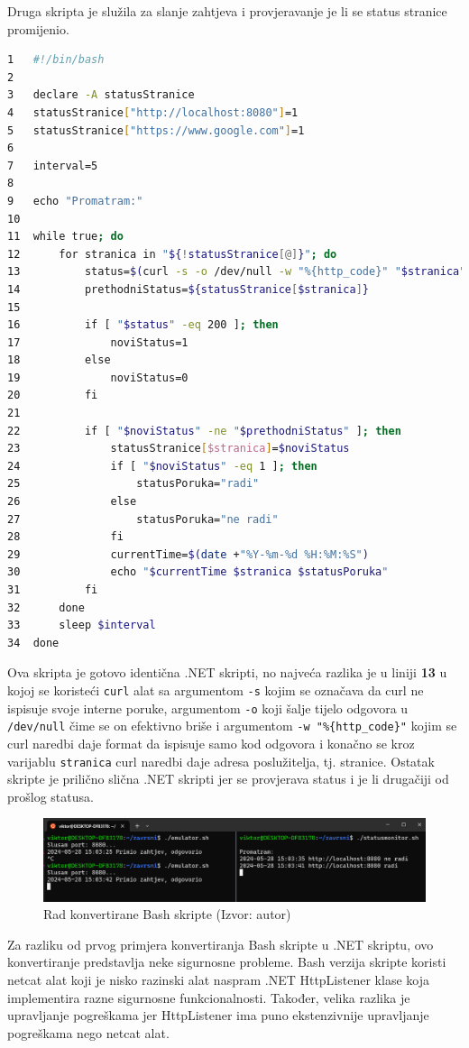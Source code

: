 \documentclass{foi}
\begin{document}
Druga skripta je služila za slanje zahtjeva i provjeravanje je li se status stranice promijenio.
\begin{lstlisting}[language=bash]
1   #!/bin/bash
2   
3   declare -A statusStranice
4   statusStranice["http://localhost:8080"]=1
5   statusStranice["https://www.google.com"]=1
6   
7   interval=5
8   
9   echo "Promatram:"
10  
11  while true; do
12      for stranica in "${!statusStranice[@]}"; do
13          status=$(curl -s -o /dev/null -w "%{http_code}" "$stranica")
14          prethodniStatus=${statusStranice[$stranica]}
15          
16          if [ "$status" -eq 200 ]; then
17              noviStatus=1
18          else
19              noviStatus=0
20          fi
21  
22          if [ "$noviStatus" -ne "$prethodniStatus" ]; then
23              statusStranice[$stranica]=$noviStatus
24              if [ "$noviStatus" -eq 1 ]; then
25                  statusPoruka="radi"
26              else
27                  statusPoruka="ne radi"
28              fi
29              currentTime=$(date +"%Y-%m-%d %H:%M:%S")
30              echo "$currentTime $stranica $statusPoruka"
31          fi
32      done
33      sleep $interval
34  done
\end{lstlisting}
Ova skripta je gotovo identična .NET skripti, no najveća razlika je u liniji \textbf{13} u kojoj se koristeći \verb|curl| alat sa argumentom \verb|-s| kojim se označava da curl ne ispisuje svoje interne poruke, argumentom \verb|-o| koji šalje tijelo odgovora u \verb|/dev/null| čime se on efektivno briše i argumentom \verb|-w "%{http_code}"| kojim se curl naredbi daje format da ispisuje samo kod odgovora i konačno se kroz varijablu \verb|stranica| curl naredbi daje adresa poslužitelja, tj. stranice. Ostatak skripte je prilično slična .NET skripti jer se provjerava status i je li drugačiji od prošlog statusa.
\begin{figure}[H]
    \centering
    \includegraphics[width=1\textwidth]{slike/netubash.png}
    \caption{Rad konvertirane Bash skripte (Izvor: autor)}
    \label{fig:netubash}
\end{figure}
Za razliku od prvog primjera konvertiranja Bash skripte u .NET skriptu, ovo konvertiranje predstavlja neke sigurnosne probleme. Bash verzija skripte koristi netcat alat koji je nisko razinski alat naspram .NET HttpListener klase koja implementira razne sigurnosne funkcionalnosti. Također, velika razlika je upravljanje pogreškama jer HttpListener ima puno ekstenzivnije upravljanje pogreškama nego netcat alat.
\end{document}
